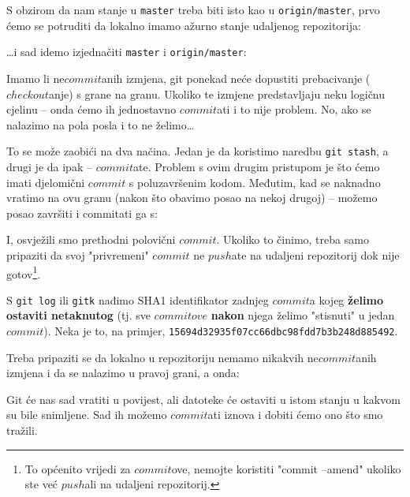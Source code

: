 S obzirom da nam stanje u \verb+master+ treba biti isto kao u \verb+origin/master+, prvo ćemo se potruditi da lokalno imamo ažurno stanje udaljenog repozitorija:


\dots{}i sad idemo izjednačiti \verb+master+ i \verb+origin/master+:



Imamo li ne$commit$anih izmjena, git ponekad neće dopustiti prebacivanje ($checkout$anje) s grane na granu.
Ukoliko te izmjene predstavljaju neku logičnu cjelinu -- onda ćemo ih jednostavno $commit$ati i to nije problem.
No, ako se nalazimo na pola posla i to ne želimo\dots

To se može zaobići na dva načina.
Jedan je da koristimo naredbu \verb+git stash+, a drugi je da ipak -- $commit$ate.
Problem s ovim drugim pristupom je što ćemo imati djelomični $commit$ s poluzavršenim kodom.  
Međutim, kad se naknadno vratimo na ovu granu (nakon što obavimo posao na nekoj drugoj) -- možemo posao završiti i commitati ga s:


I, osvježili smo prethodni polovični $commit$.
Ukoliko to činimo, treba samo pripaziti da svoj "privremeni" $commit$ ne $push$ate na udaljeni repozitorij dok nije gotov\footnote{To općenito vrijedi za $commit$ove, nemojte koristiti "commit --amend" ukoliko ste već $push$ali na udaljeni repozitorij.}.


S \verb+git log+ ili \verb+gitk+ nađimo SHA1 identifikator zadnjeg $commit$a kojeg \textbf{želimo ostaviti netaknutog} (tj. sve $commitove$ \textbf{nakon} njega želimo "stisnuti" u jedan $commit$).
Neka je to, na primjer, \verb+15694d32935f07cc66dbc98fdd7b3b248d885492+.

Treba pripaziti se da lokalno u repozitoriju nemamo nikakvih ne$commit$anih izmjena i da se nalazimo u pravoj grani, a onda:


Git će nas sad vratiti u povijest, ali datoteke će ostaviti u istom stanju u kakvom su bile snimljene.
Sad ih možemo $commit$ati iznova i dobiti ćemo ono što smo tražili.


